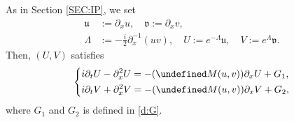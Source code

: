 \documentclass[%
11pt,  reqno]{amsart}
\newcommand{\uu}{\mathfrak u}
\newcommand{\fv}{\mathfrak v}
\newcommand{\Ld}{\Lambda}
\newcommand{\Ft}{{\mathcal{F}}}
\newcommand{\dx}{\partial_x}
\newcommand{\dt}{\partial_t}
\numberwithin{equation}{section}
\numberwithin{theorem}{section}
\let\Im=\undefined\DeclareMathOperator*{\Im}{Im}
\begin{document}
As in Section \ref{SEC:IP}, we set
\begin{equation*}
\begin{aligned}
\uu &:= \dx u, \quad \fv := \dx v,
\\
\Ld &:= - \frac i2  \dx^{-1} (u v),
\quad U := e^{-\Ld} \uu, \quad V:= e^\Ld \fv.  
\end{aligned}
\end{equation*}
Then,
$(U, V)$ satisfies
\begin{equation}
\left\{
\begin{aligned}
&i \dt U - \dx^2 U  
= - (\Im M(u,v)) \dx U + G_1,
\\
&i \dt V + \dx^2 V 
= - (\Im M(u,v)) \dx V 
+ G_2,
\end{aligned}
\right.
\label{CLLg2}
\end{equation}
where $G_1$ and $G_2$ is defined in \eqref{d:G}.
\end{document}
